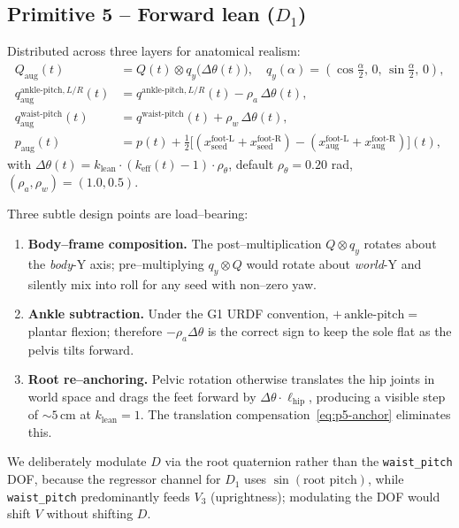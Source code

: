 \subsection{Primitive 5 -- Forward lean ($D_1$)}

Distributed across three layers for anatomical realism:
\begin{align}
  Q_{\text{aug}}(t) &= Q(t) \otimes q_y\!\bigl(\Delta\theta(t)\bigr), \quad
    q_y(\alpha)=(\cos\tfrac\alpha 2,\,0,\,\sin\tfrac\alpha 2,\,0), \label{eq:p5-quat}\\
  q_{\text{aug}}^{\text{ankle-pitch},L/R}(t) &= q^{\text{ankle-pitch},L/R}(t) - \rho_{a}\,\Delta\theta(t), \label{eq:p5-ankle}\\
  q_{\text{aug}}^{\text{waist-pitch}}(t)    &= q^{\text{waist-pitch}}(t) + \rho_{w}\,\Delta\theta(t), \label{eq:p5-waist}\\
  p_{\text{aug}}(t) &= p(t) + \tfrac{1}{2}\!\bigl[(x^{\text{foot-L}}_{\text{seed}}+x^{\text{foot-R}}_{\text{seed}}) - (x^{\text{foot-L}}_{\text{aug}}+x^{\text{foot-R}}_{\text{aug}})\bigr](t), \label{eq:p5-anchor}
\end{align}
with $\Delta\theta(t) = k_{\text{lean}}\cdot(k_{\text{eff}}(t)-1)\cdot
\rho_{\theta}$, default $\rho_\theta = 0.20$ rad,
$(\rho_a,\rho_w)=(1.0, 0.5)$.

Three subtle design points are load--bearing:
\begin{enumerate}\itemsep1pt
  \item \textbf{Body--frame composition.} The post--multiplication
        $Q\otimes q_y$ rotates about the \emph{body}-Y axis; pre--multiplying
        $q_y\otimes Q$ would rotate about \emph{world}-Y and silently mix
        into roll for any seed with non--zero yaw.
  \item \textbf{Ankle subtraction.} Under the G1 URDF convention,
        $+\,\text{ankle-pitch} = $ plantar flexion; therefore
        $-\rho_a\Delta\theta$ is the correct sign to keep the sole flat
        as the pelvis tilts forward.
  \item \textbf{Root re--anchoring.} Pelvic rotation otherwise translates
        the hip joints in world space and drags the feet forward by
        $\Delta\theta\cdot\ell_{\text{hip}}$, producing a visible step
        of $\sim\!5\,$cm at $k_{\text{lean}}\!=\!1$. The translation
        compensation~\eqref{eq:p5-anchor} eliminates this.
\end{enumerate}

We deliberately modulate $D$ via the root quaternion rather than the
\texttt{waist\_pitch} DOF, because the regressor channel for
$D_1$ uses $\sin(\text{root pitch})$, while \texttt{waist\_pitch}
predominantly feeds $V_3$ (uprightness); modulating the DOF would shift
$V$ without shifting $D$.

